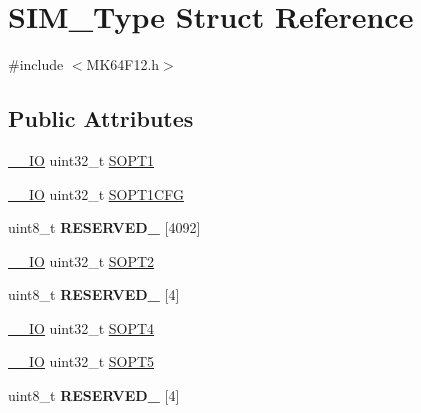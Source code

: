 \hypertarget{structSIM__Type}{}\section{S\+I\+M\+\_\+\+Type Struct Reference}
\label{structSIM__Type}


{\ttfamily \#include $<$M\+K64\+F12.\+h$>$}

\subsection*{Public Attributes}
\begin{DoxyCompactItemize}
\item 
\hyperlink{core__sc300_8h_aec43007d9998a0a0e01faede4133d6be}{\+\_\+\+\_\+\+IO} uint32\+\_\+t \hyperlink{structSIM__Type_a71da199104a0c6df7a9b6ef58c5e4edb}{S\+O\+P\+T1}
\item 
\hyperlink{core__sc300_8h_aec43007d9998a0a0e01faede4133d6be}{\+\_\+\+\_\+\+IO} uint32\+\_\+t \hyperlink{structSIM__Type_a5dcd927f581c0770092bd59289fe7145}{S\+O\+P\+T1\+C\+FG}
\item 
uint8\+\_\+t {\bfseries R\+E\+S\+E\+R\+V\+E\+D\+\_} \mbox{[}4092\mbox{]}\hypertarget{structSIM__Type_ad6da5e2e333813ef4afc3e01f2a3b39c}{}\label{structSIM__Type_ad6da5e2e333813ef4afc3e01f2a3b39c}

\item 
\hyperlink{core__sc300_8h_aec43007d9998a0a0e01faede4133d6be}{\+\_\+\+\_\+\+IO} uint32\+\_\+t \hyperlink{structSIM__Type_a42567e1697afc977709f14fe6d9f96a8}{S\+O\+P\+T2}
\item 
uint8\+\_\+t {\bfseries R\+E\+S\+E\+R\+V\+E\+D\+\_} \mbox{[}4\mbox{]}\hypertarget{structSIM__Type_afbf6c240f024cc9d7d9019982fb5a4f3}{}\label{structSIM__Type_afbf6c240f024cc9d7d9019982fb5a4f3}

\item 
\hyperlink{core__sc300_8h_aec43007d9998a0a0e01faede4133d6be}{\+\_\+\+\_\+\+IO} uint32\+\_\+t \hyperlink{structSIM__Type_a44b7f87f2a822cb3f8f1275f478e485d}{S\+O\+P\+T4}
\item 
\hyperlink{core__sc300_8h_aec43007d9998a0a0e01faede4133d6be}{\+\_\+\+\_\+\+IO} uint32\+\_\+t \hyperlink{structSIM__Type_a29d8c8ea1f1cd3f4f1b34b4a48066b63}{S\+O\+P\+T5}
\item 
uint8\+\_\+t {\bfseries R\+E\+S\+E\+R\+V\+E\+D\+\_} \mbox{[}4\mbox{]}\hypertarget{structSIM__Type_a1b53099023a7dab9deb613ef15b58380}{}\label{structSIM__Type_a1b53099023a7dab9deb613ef15b58380}


\end{DoxyCompactItemize}
